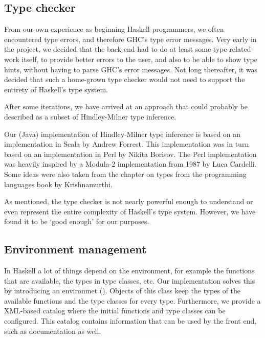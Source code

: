 \subsection{Type checker}

From our own experience as beginning Haskell programmers, we often encountered type errors, and therefore GHC's type error messages.
Very early in the project, we decided that the back end had to do at least some type-related work itself, to provide better errors to the user, and also to be able to show type hints, without having to parse GHC's error messages.
Not long thereafter, it was decided that such a home-grown type checker would not need to support the entirety of Haskell's type system.

After some iterations, we have arrived at an approach that could probably be described as a subset of Hindley-Milner type inference.  

Our (Java) implementation of Hindley-Milner type inference is based on an implementation in Scala by Andrew Forrest\cite{forrest}.
This implementation was in turn based on an implementation in Perl by Nikita Borisov\cite{borisov}.
The Perl implementation was heavily inspired by a Modula-2 implementation from 1987 by Luca Cardelli\cite{cardelli}.
Some ideas were also taken from the chapter on types from the programming languages book by Krishnamurthi\cite{plai}.

As mentioned, the type checker is not nearly powerful enough to understand or even represent the entire complexity of Haskell's type system.
However, we have found it to be `good enough' for our purposes.

\subsection{Environment management}

In Haskell a lot of things depend on the environment, for example the functions that are available, the types in type classes, etc.
Our implementation solves this by introducing an environmet ().
Objects of this class keep the types of the available functions and the type classes for every type.
Furthermore, we provide a XML-based catalog where the initial functions and type classes can be configured.
This catalog contains information that can be used by the front end, such as documentation as well.